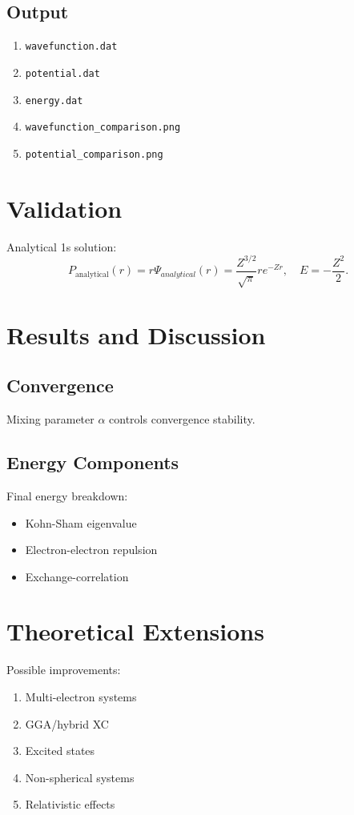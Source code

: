 \documentclass[12pt,a4paper]{article}
\begin{document}
\subsection{Output}
\begin{enumerate}
    \item \texttt{wavefunction.dat}
    \item \texttt{potential.dat}
    \item \texttt{energy.dat}
    \item \texttt{wavefunction\_comparison.png}
    \item \texttt{potential\_comparison.png}
\end{enumerate}

\section{Validation}

Analytical 1s solution:
\[
P_\text{analytical}(r) = r\Psi_{analytical}(r) = \frac{Z^{3/2}}{\sqrt{\pi}}re^{-Zr}, \quad E = -\frac{Z^2}{2}.
\]

\section{Results and Discussion}

\subsection{Convergence}
Mixing parameter $\alpha$ controls convergence stability.

\subsection{Energy Components}
Final energy breakdown:
\begin{itemize}
    \item Kohn-Sham eigenvalue
    \item Electron-electron repulsion
    \item Exchange-correlation
\end{itemize}

\section{Theoretical Extensions}
Possible improvements:
\begin{enumerate}
    \item Multi-electron systems
    \item GGA/hybrid XC
    \item Excited states
    \item Non-spherical systems
    \item Relativistic effects
\end{enumerate}
\end{document}
